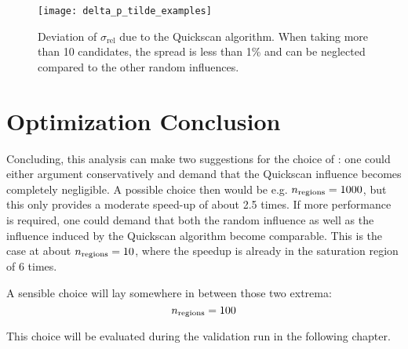 \begin{figure}[htbp]
	\centering
	\texttt{[image: delta\_p\_tilde\_examples]}
	\caption{Deviation of $\sigma_\mathrm{rel}$ due to the Quickscan algorithm. When taking more than 10 candidates, the spread is less than \unit{1}{\%} and can be neglected compared to the other random influences.}
	\label{fig:delta_p_tilde_examples}
\end{figure}




\section{Optimization Conclusion}
Concluding, this analysis can make two suggestions for the choice of \paramregions: one could either argument conservatively and demand that the Quickscan influence becomes completely negligible. A possible choice then would be e.g. ${n_\mathrm{regions}} = 1000$, but this only provides a moderate speed-up of about 2.5 times. 
If more performance is required, one could demand that both the random influence as well as the influence induced by the Quickscan algorithm become comparable. This is the case at about ${n_\mathrm{regions}} = 10$, where the speedup is already in the saturation region of 6 times.

A sensible choice will lay somewhere in between those two extrema:
\begin{equation}
	{n_\mathrm{regions}} = 100
\end{equation}

This choice will be evaluated during the validation run in the following chapter.
